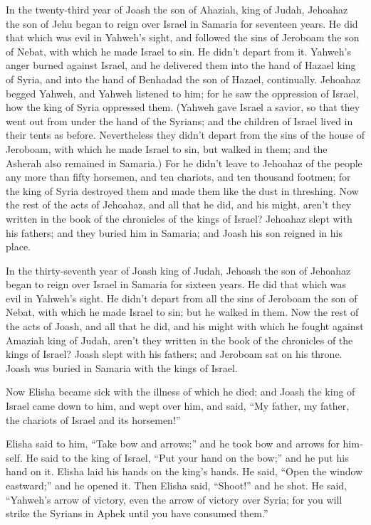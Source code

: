 \begin{paracol}{2}
\begin{otherlanguage}{english}
 In the twenty-third year of Joash the son of Ahaziah,
king of Judah, Jehoahaz the son of Jehu began to reign over Israel in
Samaria for seventeen years.  He did that which was evil
in Yahweh's sight, and followed the sins of Jeroboam the son of Nebat,
with which he made Israel to sin. He didn't depart from it.
 Yahweh's anger burned against Israel, and he delivered
them into the hand of Hazael king of Syria, and into the hand of
Benhadad the son of Hazael, continually.  Jehoahaz begged
Yahweh, and Yahweh listened to him; for he saw the oppression of Israel,
how the king of Syria oppressed them.  (Yahweh gave Israel
a savior, so that they went out from under the hand of the Syrians; and
the children of Israel lived in their tents as before. 
Nevertheless they didn't depart from the sins of the house of Jeroboam,
with which he made Israel to sin, but walked in them; and the Asherah
also remained in Samaria.)  For he didn't leave to
Jehoahaz of the people any more than fifty horsemen, and ten chariots,
and ten thousand footmen; for the king of Syria destroyed them and made
them like the dust in threshing.  Now the rest of the acts
of Jehoahaz, and all that he did, and his might, aren't they written in
the book of the chronicles of the kings of Israel? 
Jehoahaz slept with his fathers; and they buried him in Samaria; and
Joash his son reigned in his place.

 In the thirty-seventh year of Joash king of Judah,
Jehoash the son of Jehoahaz began to reign over Israel in Samaria for
sixteen years.  He did that which was evil in Yahweh's
sight. He didn't depart from all the sins of Jeroboam the son of Nebat,
with which he made Israel to sin; but he walked in them. 
Now the rest of the acts of Joash, and all that he did, and his might
with which he fought against Amaziah king of Judah, aren't they written
in the book of the chronicles of the kings of Israel? 
Joash slept with his fathers; and Jeroboam sat on his throne. Joash was
buried in Samaria with the kings of Israel.

 Now Elisha became sick with the illness of which he
died; and Joash the king of Israel came down to him, and wept over him,
and said, ``My father, my father, the chariots of Israel and its
horsemen!''

 Elisha said to him, ``Take bow and arrows;'' and he took
bow and arrows for himself.  He said to the king of
Israel, ``Put your hand on the bow;'' and he put his hand on it. Elisha
laid his hands on the king's hands.  He said, ``Open the
window eastward;'' and he opened it. Then Elisha said, ``Shoot!'' and he
shot. He said, ``Yahweh's arrow of victory, even the arrow of victory
over Syria; for you will strike the Syrians in Aphek until you have
consumed them.''


\end{otherlanguage}
\end{paracol}
